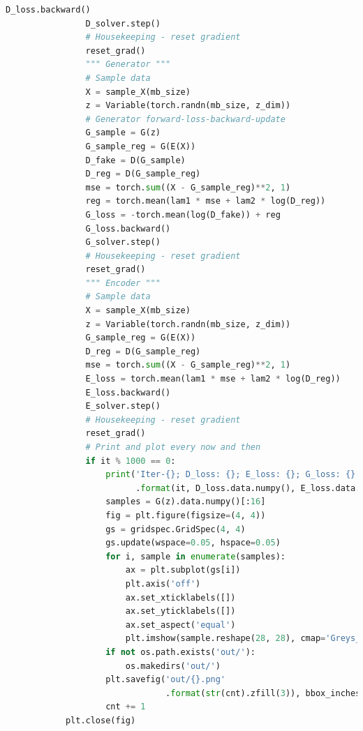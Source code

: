 \begin{lstlisting}[language = Python]
                D_loss.backward()
                D_solver.step()
                # Housekeeping - reset gradient
                reset_grad()
                """ Generator """
                # Sample data
                X = sample_X(mb_size)
                z = Variable(torch.randn(mb_size, z_dim))
                # Generator forward-loss-backward-update
                G_sample = G(z)
                G_sample_reg = G(E(X))
                D_fake = D(G_sample)
                D_reg = D(G_sample_reg)
                mse = torch.sum((X - G_sample_reg)**2, 1)
                reg = torch.mean(lam1 * mse + lam2 * log(D_reg))
                G_loss = -torch.mean(log(D_fake)) + reg
                G_loss.backward()
                G_solver.step()
                # Housekeeping - reset gradient
                reset_grad()
                """ Encoder """
                # Sample data
                X = sample_X(mb_size)
                z = Variable(torch.randn(mb_size, z_dim))
                G_sample_reg = G(E(X))
                D_reg = D(G_sample_reg)
                mse = torch.sum((X - G_sample_reg)**2, 1)
                E_loss = torch.mean(lam1 * mse + lam2 * log(D_reg))
                E_loss.backward()
                E_solver.step()
                # Housekeeping - reset gradient
                reset_grad()
                # Print and plot every now and then
                if it % 1000 == 0:
                    print('Iter-{}; D_loss: {}; E_loss: {}; G_loss: {}'
                          .format(it, D_loss.data.numpy(), E_loss.data.numpy(), G_loss.data.numpy()))
                    samples = G(z).data.numpy()[:16]
                    fig = plt.figure(figsize=(4, 4))
                    gs = gridspec.GridSpec(4, 4)
                    gs.update(wspace=0.05, hspace=0.05)
                    for i, sample in enumerate(samples):
                        ax = plt.subplot(gs[i])
                        plt.axis('off')
                        ax.set_xticklabels([])
                        ax.set_yticklabels([])
                        ax.set_aspect('equal')
                        plt.imshow(sample.reshape(28, 28), cmap='Greys_r')
                    if not os.path.exists('out/'):
                        os.makedirs('out/')
                    plt.savefig('out/{}.png'
                                .format(str(cnt).zfill(3)), bbox_inches='tight')
                    cnt += 1
            plt.close(fig)
            \end{lstlisting}

